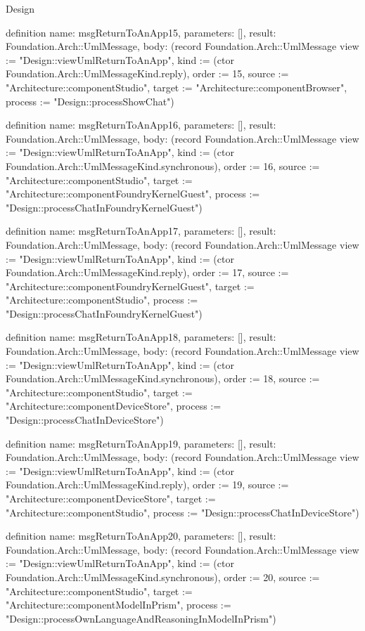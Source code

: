 \begin{lexlean}{Design}
\begin{semanticmodule}
definition{
  name: msgReturnToAnApp15,
  parameters: [],
  result: Foundation.Arch::UmlMessage,
  body: (record Foundation.Arch::UmlMessage {view := "Design::viewUmlReturnToAnApp", kind := (ctor Foundation.Arch::UmlMessageKind.reply), order := 15, source := "Architecture::componentStudio", target := "Architecture::componentBrowser", process := "Design::processShowChat"})
}

definition{
  name: msgReturnToAnApp16,
  parameters: [],
  result: Foundation.Arch::UmlMessage,
  body: (record Foundation.Arch::UmlMessage {view := "Design::viewUmlReturnToAnApp", kind := (ctor Foundation.Arch::UmlMessageKind.synchronous), order := 16, source := "Architecture::componentStudio", target := "Architecture::componentFoundryKernelGuest", process := "Design::processChatInFoundryKernelGuest"})
}

definition{
  name: msgReturnToAnApp17,
  parameters: [],
  result: Foundation.Arch::UmlMessage,
  body: (record Foundation.Arch::UmlMessage {view := "Design::viewUmlReturnToAnApp", kind := (ctor Foundation.Arch::UmlMessageKind.reply), order := 17, source := "Architecture::componentFoundryKernelGuest", target := "Architecture::componentStudio", process := "Design::processChatInFoundryKernelGuest"})
}

definition{
  name: msgReturnToAnApp18,
  parameters: [],
  result: Foundation.Arch::UmlMessage,
  body: (record Foundation.Arch::UmlMessage {view := "Design::viewUmlReturnToAnApp", kind := (ctor Foundation.Arch::UmlMessageKind.synchronous), order := 18, source := "Architecture::componentStudio", target := "Architecture::componentDeviceStore", process := "Design::processChatInDeviceStore"})
}

definition{
  name: msgReturnToAnApp19,
  parameters: [],
  result: Foundation.Arch::UmlMessage,
  body: (record Foundation.Arch::UmlMessage {view := "Design::viewUmlReturnToAnApp", kind := (ctor Foundation.Arch::UmlMessageKind.reply), order := 19, source := "Architecture::componentDeviceStore", target := "Architecture::componentStudio", process := "Design::processChatInDeviceStore"})
}

definition{
  name: msgReturnToAnApp20,
  parameters: [],
  result: Foundation.Arch::UmlMessage,
  body: (record Foundation.Arch::UmlMessage {view := "Design::viewUmlReturnToAnApp", kind := (ctor Foundation.Arch::UmlMessageKind.synchronous), order := 20, source := "Architecture::componentStudio", target := "Architecture::componentModelInPrism", process := "Design::processOwnLanguageAndReasoningInModelInPrism"})
}


\end{semanticmodule}
\end{lexlean}
